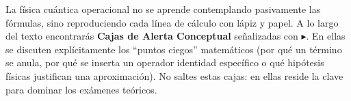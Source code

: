 

\begin{alertabox}
    La física cuántica operacional no se aprende contemplando pasivamente las fórmulas, sino reproduciendo cada línea de cálculo con lápiz y papel. A lo largo del texto encontrarás \textbf{Cajas de Alerta Conceptual} señalizadas con $\blacktriangleright$. En ellas se discuten explícitamente los \enquote{puntos ciegos} matemáticos (por qué un término se anula, por qué se inserta un operador identidad específico o qué hipótesis físicas justifican una aproximación). No saltes estas cajas: en ellas reside la clave para dominar los exámenes teóricos.
\end{alertabox}
